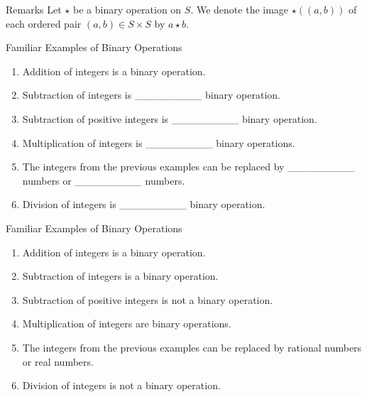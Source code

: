 \documentclass{beamer}
\begin{document}
\begin{frame}{Remarks}
\justifying
Let $\star$ be a binary operation on $S$. We denote the image $\star\left((a, b)\right)$ of each ordered pair $(a, b) \in S \times S$ by $a \star b$.
\end{frame}

\begin{frame}{Familiar Examples of Binary Operations}
\begin{enumerate}
\justifying
\item Addition of integers is a binary operation. 
\item Subtraction of integers is \_\_\_\_\_\_\_\_\_ binary operation. 
\item Subtraction of positive integers is \_\_\_\_\_\_\_\_\_ binary operation. 
\item Multiplication of integers is \_\_\_\_\_\_\_\_\_ binary operations.
\item The integers from the previous examples can be replaced by \_\_\_\_\_\_\_\_\_ numbers or \_\_\_\_\_\_\_\_\_ numbers. 
\item Division of integers is \_\_\_\_\_\_\_\_\_ binary operation.
\end{enumerate}    
\end{frame}

\begin{frame}{Familiar Examples of Binary Operations}
\begin{enumerate}
\justifying
\item Addition of integers is a binary operation. 
\item Subtraction of integers is a binary operation. 
\item Subtraction of positive integers is not a binary operation. 
\item Multiplication of integers are binary operations.
\item The integers from the previous examples can be replaced by rational numbers or real numbers. 
\item Division of integers is not a binary operation.
\end{enumerate}    
\end{frame}
\end{document}
